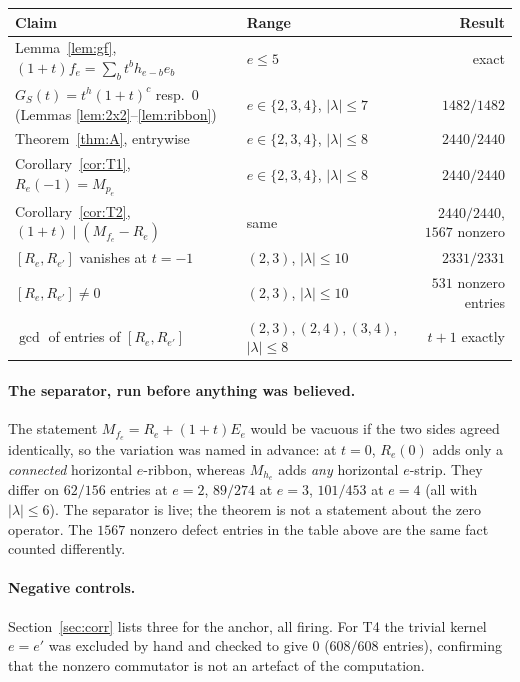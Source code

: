 \documentclass[11pt]{article}
\theoremstyle{definition}
\begin{document}
\begin{center}
\begin{tabular}{llr}
\toprule
Claim & Range & Result\\
\midrule
Lemma~\ref{lem:gf}, $(1+t)f_e=\sum_bt^bh_{e-b}e_b$ & $e\le5$ & exact\\
$G_S(t)=t^{h}(1+t)^{c}$ resp.\ $0$ (Lemmas \ref{lem:2x2}--\ref{lem:ribbon})
   & $e\in\{2,3,4\}$, $|\lambda|\le7$ & $1482/1482$\\
Theorem~\ref{thm:A}, entrywise & $e\in\{2,3,4\}$, $|\lambda|\le8$ & $2440/2440$\\
Corollary~\ref{cor:T1}, $R_e(-1)=M_{p_e}$ & $e\in\{2,3,4\}$, $|\lambda|\le8$ & $2440/2440$\\
Corollary~\ref{cor:T2}, $(1+t)\mid(M_{f_e}-R_e)$ & same & $2440/2440$, $1567$ nonzero\\
$[R_e,R_{e'}]$ vanishes at $t=-1$ & $(2,3)$, $|\lambda|\le10$ & $2331/2331$\\
$[R_e,R_{e'}]\ne0$ & $(2,3)$, $|\lambda|\le10$ & $531$ nonzero entries\\
$\gcd$ of entries of $[R_e,R_{e'}]$ & $(2,3),(2,4),(3,4)$, $|\lambda|\le8$ & $t+1$ exactly\\
\bottomrule
\end{tabular}
\end{center}

\paragraph{The separator, run before anything was believed.} The statement
$M_{f_e}=R_e+(1+t)E_e$ would be vacuous if the two sides agreed identically, so the variation
was named in advance: at $t=0$, $R_e(0)$ adds only a \emph{connected} horizontal $e$-ribbon,
whereas $M_{h_e}$ adds \emph{any} horizontal $e$-strip. They differ on $62/156$ entries at
$e=2$, $89/274$ at $e=3$, $101/453$ at $e=4$ (all with $|\lambda|\le6$). The separator is live;
the theorem is not a statement about the zero operator. The $1567$ nonzero defect entries in the
table above are the same fact counted differently.

\paragraph{Negative controls.} Section~\ref{sec:corr} lists three for the anchor, all firing.
For T4 the trivial kernel $e=e'$ was excluded by hand and checked to give $0$
($608/608$ entries), confirming that the nonzero commutator is not an artefact of the
computation.
\end{document}
